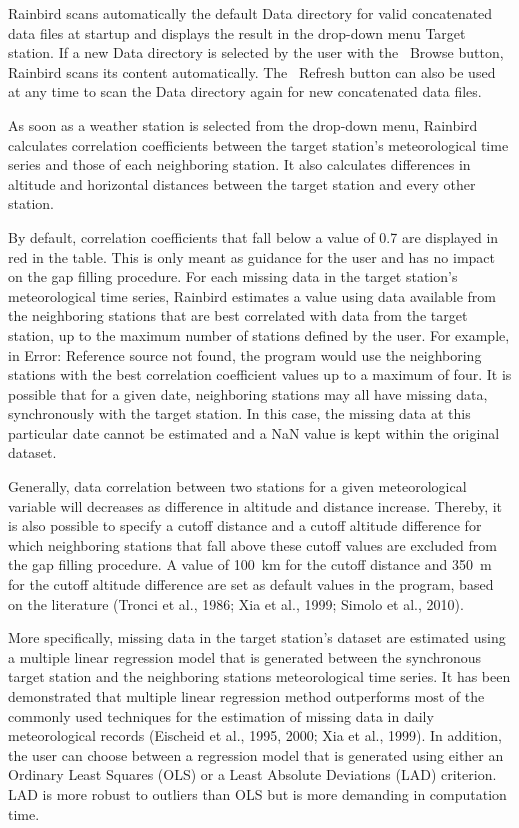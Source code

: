 \documentclass[12pt, letterpaper, fleqn]{report}
\begin{document}
Rainbird scans automatically the default Data directory for valid concatenated data files at startup and displays the result in the drop-down menu Target station. If a new Data directory is selected by the user with the  Browse button, Rainbird scans its content automatically. The  Refresh button can also be used at any time to scan the Data directory again for new concatenated data files.

As soon as a weather station is selected from the drop-down menu, Rainbird calculates correlation coefficients between the target station's meteorological time series and those of each neighboring station. It also calculates differences in altitude and horizontal distances between the target station and every other station.

By default, correlation coefficients that fall below a value of 0.7 are displayed in red in the table. This is only meant as guidance for the user and has no impact on the gap filling procedure. For each missing data in the target station's meteorological time series, Rainbird estimates a value using data available from the neighboring stations that are best correlated with data from the target station, up to the maximum number of stations defined by the user. For example, in Error: Reference source not found, the program would use the neighboring stations with the best correlation coefficient values up to a maximum of four. It is possible that for a given date, neighboring stations may all have missing data, synchronously with the target station. In this case, the missing data at this particular date cannot be estimated and a NaN value is kept within the original dataset.

Generally, data correlation between two stations for a given meteorological variable will decreases as difference in altitude and distance increase. Thereby, it is also possible to specify a cutoff distance and a cutoff altitude difference for which neighboring stations that fall above these cutoff values are excluded from the gap filling procedure. A value of 100 km for the cutoff distance and 350 m for the cutoff altitude difference are set as default values in the program, based on the literature (Tronci et al., 1986; Xia et al., 1999; Simolo et al., 2010).

More specifically, missing data in the target station's dataset are estimated using a multiple linear regression model that is generated between the synchronous target station and the neighboring stations meteorological time series. It has been demonstrated that multiple linear regression method outperforms most of the commonly used techniques for the estimation of missing data in daily meteorological records (Eischeid et al., 1995, 2000; Xia et al., 1999). In addition, the user can choose between a regression model that is generated using either an Ordinary Least Squares (OLS) or a Least Absolute Deviations (LAD) criterion. LAD is more robust to outliers than OLS but is more demanding in computation time.
\end{document}
